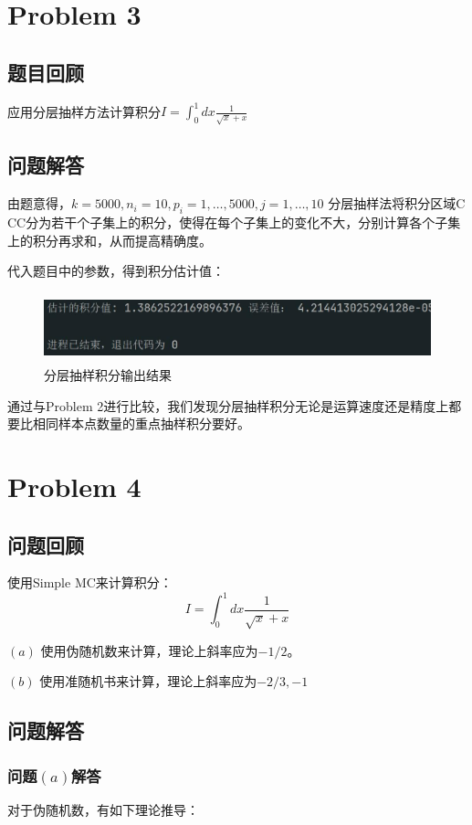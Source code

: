 \documentclass[12pt,a4paper]{article}%
\begin{document}
\section{Problem 3}
\subsection{题目回顾}
应用分层抽样方法计算积分$I=\int_{0}^{1}dx \frac{1}{\sqrt{x}+x}$

\subsection{问题解答}
由题意得，$k=5000,n_i=10,p_i=1,\dots,5000,j=1,\dots,10$
分层抽样法将积分区域C CC分为若干个子集上的积分，使得在每个子集上的变化不大，分别计算各个子集上的积分再求和，从而提高精确度。

代入题目中的参数，得到积分估计值：
\begin{figure}[htbp]
    \centering
    \includegraphics[height=2cm]{P3.jpg}
    \caption{分层抽样积分输出结果}
\end{figure}

通过与Problem 2进行比较，我们发现分层抽样积分无论是运算速度还是精度上都要比相同样本点数量的重点抽样积分要好。

\section{Problem 4}
\subsection{问题回顾}
使用Simple MC来计算积分：
\[I=\int_{0}^{1}dx\frac{1}{\sqrt{x}+x}\]

$\left(a\right)$ 使用伪随机数来计算，理论上斜率应为$-1/2$。

$\left(b\right)$ 使用准随机书来计算，理论上斜率应为$-2/3,-1$

\subsection{问题解答}
\subsubsection{问题$\left(a\right)$解答}
对于伪随机数，有如下理论推导：
\end{document}
